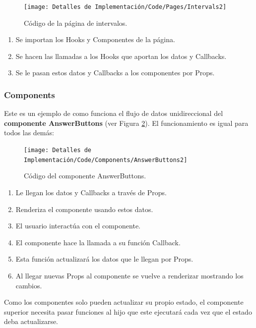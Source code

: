 \documentclass[12pt,twoside,titlepage]{report}
\begin{document}
\begin{figure}[H]
    \centering
    \texttt{[image: Detalles de Implementación/Code/Pages/Intervals2]}
    \caption{Código de la página de intervalos.}
    \label{fig:IntervalsPage}
\end{figure}


\begin{enumerate}
    \item  Se importan los Hooks y Componentes de la página.
    \item  Se hacen las llamadas a los Hooks que aportan los datos y Callbacks.
    \item  Se le pasan estos datos y Callbacks a los componentes por Props.
\end{enumerate}


\subsubsection{Components}

Este es un ejemplo de como funciona el flujo de datos unidireccional del \textbf{componente AnswerButtons} (ver Figura \ref{fig:AnswerButtons}). El funcionamiento es igual para todos las demás: 

\begin{figure}[H]
    \centering
    \texttt{[image: Detalles de Implementación/Code/Components/AnswerButtons2]}
    \caption{Código del componente AnswerButtons.}
    \label{fig:AnswerButtons}
\end{figure}

\begin{enumerate}
    \item Le llegan los datos y Callbacks a través de Props.
    \item Renderiza el componente usando estos datos.
    \item El usuario interactúa con el componente.
    \item El componente hace la llamada a su función Callback.
    \item Esta función actualizará los datos que le llegan por Props.
    \item Al llegar nuevas Props al componente se vuelve a renderizar mostrando los cambios.
\end{enumerate}

Como los componentes solo pueden actualizar su propio estado, el componente superior necesita pasar funciones al hijo que este ejecutará cada vez que el estado deba actualizarse.
\end{document}
